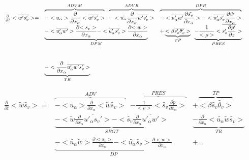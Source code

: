 \begin{displaymath}
\left.
\begin{array}{rllll}
\frac{\partial }{\partial t} <\overline{w's_v'}> = & 
\overbrace{- <u_\alpha>\frac{\partial}{\partial x_\alpha} <\overline{w's_v'}> }^{ADVM} \;\;
\overbrace{- <\tilde{u_\alpha}\frac{\partial}{\partial x_\alpha} \overline{w's_v'} > }^{ADVR} &
\overbrace{- <\overline{u'_\alpha w'} \frac{\partial {\tilde{s_v}}}{\partial x_\alpha}>
- <\overline{u'_\alpha s_v'} \frac{\partial {\tilde{w}}}{\partial x_\alpha}>}^{DPR}&\\
\vspace*{1.0cm}
& \underbrace{- <\overline{u_\alpha'w'}> \frac{\partial {<s_v>}}{\partial x_\alpha}
- <\overline{u'_\alpha s_v'}> \frac{\partial {<w>}}{\partial x_\alpha}}_{DPM}&
+ \underbrace{<\beta  \overline{s_v'\theta'_v}>}_{TP} \;\; \underbrace{- \frac{1}{<\rho>}<\overline{s_v' \frac{\partial p'}{\partial z}}>}_{PRES}&\\
&\underbrace{- <\frac{\partial}{\partial x_\alpha} \overline{u'_\alpha w's_v'}>}_{TR}&&& \\
\end{array}
\right.
\end{displaymath}

\begin{displaymath}
\left.
\begin{array}{rllll}
\frac{\partial }{\partial t} <\tilde{w}\tilde{s_v}> = & 
\overbrace{- <u_\alpha>\frac{\partial}{\partial x_\alpha} <\tilde{w}\tilde{s_v}> }^{ADV} \;\;
\overbrace{- \frac{1}{<\rho>}<\tilde{s_v} \frac{\partial \tilde{p}}{\partial x_\alpha}>}^{PRES} &
+\overbrace{<\beta  \tilde{s_v}\tilde{\theta_v}>}^{TP}&\\
&\underbrace{- <\tilde{w}\frac{\partial}{\partial x_\alpha}\overline{u'_\alpha s_v'}>
- <\tilde{s_v}\frac{\partial}{\partial x_\alpha}\overline{u'_\alpha w'}>}_{SBGT} &
 \underbrace{- \frac{\partial}{\partial x_\alpha} <\tilde{u_\alpha} \tilde{w}\tilde{s_v}>}_{TR} & & \\
&\underbrace{- <\tilde{u_\alpha} \tilde{w}> \frac{\partial {<s_v>}}{\partial x_\alpha}
- <\tilde{u_\alpha} \tilde{s_v}> \frac{\partial {<w>}}{\partial x_\alpha}}_{DP}&+...&& \\
\end{array}
\right.
\end{displaymath}

